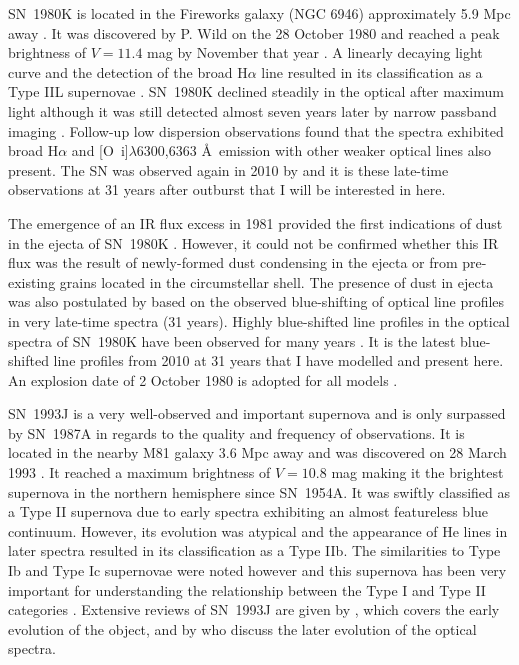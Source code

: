 SN~1980K is located in the Fireworks galaxy (NGC 6946) approximately 5.9 Mpc away \citep{Karachentsev2000}.  It was discovered by P. Wild on the 28 October 1980 and  reached a peak brightness of $V=11.4$ mag by November that year \citep{Buta1982}.  A linearly decaying light curve and the detection of the broad H$\alpha$ line resulted in its classification as a Type IIL supernovae \citep{Barbon1982}.  SN~1980K declined steadily in the optical after maximum light although it was still detected almost seven years later by narrow passband imaging \citep{Fesen1988}.  Follow-up low dispersion observations found that the spectra exhibited broad H$\alpha$ and [O~{\sc i}]$\lambda$6300,6363 \AA\  emission with other weaker optical lines also present.  The SN was observed again in 2010 by \citet{Milisavljevic2012} and it is these late-time observations at 31 years after outburst that I will be interested in here.  

The emergence of an IR flux excess in 1981  provided the first indications of dust in the ejecta of SN~1980K \citep{Dwek1983}.  However, it could not be confirmed whether this IR flux was the result of newly-formed dust condensing in the ejecta or from pre-existing grains located in the circumstellar shell.  The presence of dust in ejecta was also postulated by \citet{Milisavljevic2012} based on the observed blue-shifting of optical line profiles in very late-time spectra (31 years). Highly blue-shifted line profiles in the optical spectra of SN~1980K have been observed for many years \citep{Fesen1990,Fesen1994,Fesen1995,Fesen1999}.  It is the latest blue-shifted line profiles from 2010 at 31 years that I have modelled and present here.  An explosion date of 2 October 1980 is adopted for all models \citep{Montes1998}.


SN~1993J is a very well-observed and important supernova and is only surpassed  by SN~1987A in regards to the quality and frequency of observations.  It is located in the nearby M81 galaxy 3.6 Mpc away \citep{Freedman1994} and was discovered on 28 March 1993 \citep{Ripero1993}.  It reached a maximum brightness of $V=10.8$ mag making it the brightest supernova in the northern hemisphere since SN~1954A. It was swiftly classified as a Type II supernova due to early spectra exhibiting an almost featureless blue continuum.  However, its evolution was atypical and the appearance of He lines in later spectra resulted in its classification as a Type IIb.  The similarities to Type Ib and Type Ic supernovae were noted however and this supernova has been very important for understanding the relationship between the Type I and Type II categories \citep{Fillipenko1993,Garnavich1993}.  Extensive reviews of SN~1993J are given by \citet{Wheeler1996}, which covers the early evolution of the object, and by \citet{Matheson2000a,Matheson2000b} who discuss the later evolution of the optical spectra.  

